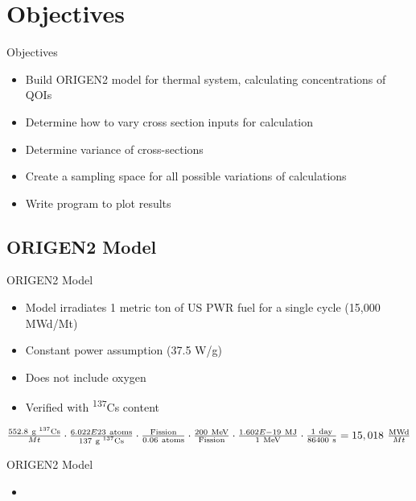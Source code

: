 \documentclass{beamer}
\newcommand{\inputdeckpages}[3]{
\begin{itemize}
\item[]
\end{itemize}
}
\newcommand{\tss}{\textsuperscript}
\newcommand{\ndone}{\rlap{$\square$}{\raisebox{2pt}{}}%
  \hspace{8pt}}
\begin{document}
\section{Objectives}
\begin{frame}
\begin{block}{Objectives}
  \begin{itemize}
  \item[\ndone]{Build ORIGEN2 model for thermal system, calculating
  concentrations of QOIs}
  \item[\ndone]{Determine how to vary cross section inputs for calculation}
  \item[\ndone]{Determine variance of cross-sections}
  \item[\ndone]{Create a sampling space for all possible variations of
    calculations}
  \item[\ndone]{Write program to plot results}
  \end{itemize}
\end{block}
\end{frame}



\subsection{ORIGEN2 Model}
\begin{frame}{ORIGEN2 Model}
  \begin{itemize}
  \item{Model irradiates 1 metric ton of US PWR fuel for a single
    cycle (15,000 MWd/Mt)}
  \item{Constant power assumption (37.5 W/g)}
  \item{Does not include oxygen}
  \item{Verified with \tss{137}Cs content}
  \end{itemize}
  \vspace{4mm}
  \begin{center}
    \small
    $
    \frac{552.8\ \text{g \tss{137}Cs}}{Mt}\cdot
    \frac{6.022E23\ \text{atoms}}{137\ \text{g \tss{137}Cs}}\cdot
    \frac{\text{Fission}}{0.06\ \text{atoms}}\cdot
    \frac{200\ \text{MeV}}{\text{Fission}}\cdot
    \frac{1.602E-19\ \text{MJ}}{1\ \text{MeV}}\cdot
    \frac{1\ \text{day}}{86400\ \text{s}}=15,018\ \frac{\text{MWd}}{Mt}$
  \end{center}
\end{frame}

\begin{frame}{ORIGEN2 Model}
  \inputdeckpages{../Origen2/TAPE5}{4}{25} %
\end{frame}
\end{document}
